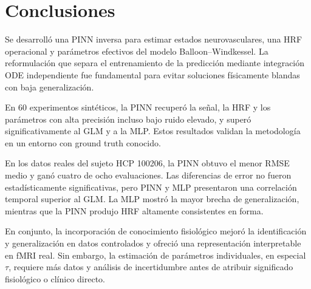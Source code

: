 \section{Conclusiones}

Se desarrolló una PINN inversa para estimar estados neurovasculares, una HRF operacional y parámetros efectivos del modelo Balloon--Windkessel. La reformulación que separa el entrenamiento de la predicción mediante integración ODE independiente fue fundamental para evitar soluciones físicamente blandas con baja generalización.

En 60 experimentos sintéticos, la PINN recuperó la señal, la HRF y los parámetros con alta precisión incluso bajo ruido elevado, y superó significativamente al GLM y a la MLP. Estos resultados validan la metodología en un entorno con ground truth conocido.

En los datos reales del sujeto HCP 100206, la PINN obtuvo el menor RMSE medio y ganó cuatro de ocho evaluaciones. Las diferencias de error no fueron estadísticamente significativas, pero PINN y MLP presentaron una correlación temporal superior al GLM. La MLP mostró la mayor brecha de generalización, mientras que la PINN produjo HRF altamente consistentes en forma.

En conjunto, la incorporación de conocimiento fisiológico mejoró la identificación y generalización en datos controlados y ofreció una representación interpretable en fMRI real. Sin embargo, la estimación de parámetros individuales, en especial $\tau$, requiere más datos y análisis de incertidumbre antes de atribuir significado fisiológico o clínico directo.
